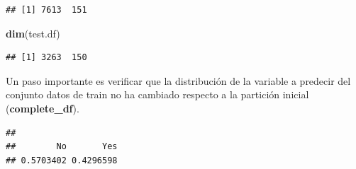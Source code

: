 \documentclass[]{article}
\newenvironment{Shaded}{\begin{snugshade}}{\end{snugshade}}
\newcommand{\DataTypeTok}[1]{\textcolor[rgb]{0.13,0.29,0.53}{#1}}
\newcommand{\DecValTok}[1]{\textcolor[rgb]{0.00,0.00,0.81}{#1}}
\newcommand{\KeywordTok}[1]{\textcolor[rgb]{0.13,0.29,0.53}{\textbf{#1}}}
\newcommand{\NormalTok}[1]{#1}
\newcommand{\OperatorTok}[1]{\textcolor[rgb]{0.81,0.36,0.00}{\textbf{#1}}}
\newcommand{\StringTok}[1]{\textcolor[rgb]{0.31,0.60,0.02}{#1}}
\begin{document}
\begin{Shaded}
\end{Shaded}

\begin{verbatim}
## [1] 7613  151
\end{verbatim}

\begin{Shaded}
\begin{Highlighting}[]
\KeywordTok{dim}\NormalTok{(test.df)}
\end{Highlighting}
\end{Shaded}

\begin{verbatim}
## [1] 3263  150
\end{verbatim}

Un paso importante es verificar que la distribución de la variable a
predecir del conjunto datos de train no ha cambiado respecto a la
partición inicial (\textbf{complete\_df}).

\begin{Shaded}
\end{Shaded}

\begin{verbatim}
## 
##        No       Yes 
## 0.5703402 0.4296598
\end{verbatim}

\begin{Shaded}
\end{Shaded}
\end{document}
